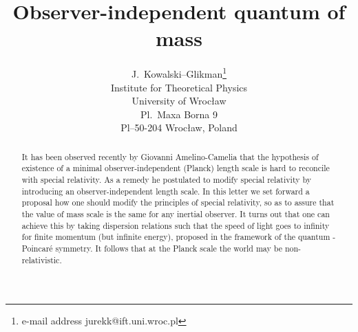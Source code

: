 \documentclass [11pt] {article}
\begin{document}
\title{%
Observer-independent quantum of mass }
\author{ J.\ Kowalski--Glikman\thanks{e-mail
address jurekk@ift.uni.wroc.pl}\\ Institute for Theoretical
Physics\\ University of Wroc\l{}aw\\ Pl.\ Maxa Borna 9\\
Pl--50-204 Wroc\l{}aw, Poland} \maketitle



\begin{abstract}

It has been observed recently by Giovanni Amelino-Camelia
\cite{gac1, gac2} that the hypothesis of existence of a minimal observer-independent
(Planck) length scale is hard to reconcile with special relativity. As a remedy
he postulated to modify special relativity by introducing an
observer-independent length scale. In this letter  we set forward
a proposal how one should modify the principles of special
relativity, so as to assure that the value of mass 
scale is the same for any inertial observer. It turns out that
one can achieve this by taking dispersion relations such that the
speed of light goes to infinity for finite momentum (but infinite
energy), proposed  in the framework of the quantum
\myHighlight{$\kappa$}\coordHE{}-Poincar\'{e} symmetry. It follows that at the Planck scale
the world may be non-relativistic.

\end{abstract}

\clearpage
\end{document}
